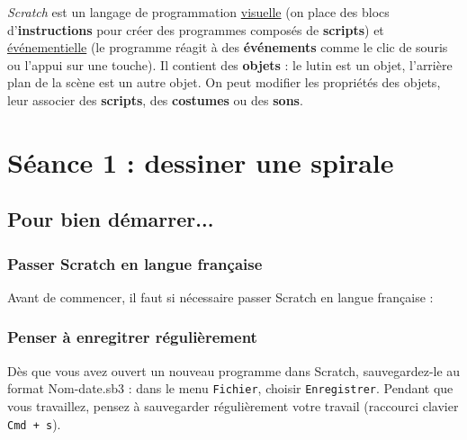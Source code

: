\emph{Scratch} est un langage de programmation \underline{visuelle} (on place des blocs d'\textbf{instructions} pour créer des programmes composés de \textbf{scripts}) et \underline{événementielle} (le programme réagit à des \textbf{événements} comme le clic de souris ou l'appui sur une touche). Il contient des \textbf{objets} : le lutin est un objet, l'arrière plan de la scène est un autre objet. On peut modifier les propriétés des objets, leur associer des \textbf{scripts}, des \textbf{costumes} ou des \textbf{sons}.   




















%
%
%
%



\section{Séance 1 : dessiner une spirale}\label{ficheScratch5e1}

\subsection{Pour bien démarrer...}

\subsubsection{Passer Scratch en langue française} 

Avant de commencer, il faut si nécessaire passer Scratch en langue française :




\subsubsection{Penser à enregitrer régulièrement}

Dès que vous avez ouvert un nouveau programme dans Scratch, sauvegardez-le au format Nom-date.sb3 : dans le menu \texttt{Fichier}, choisir \texttt{Enregistrer}. Pendant que vous travaillez, pensez à sauvegarder régulièrement votre travail (raccourci clavier \texttt{Cmd + s}).   

